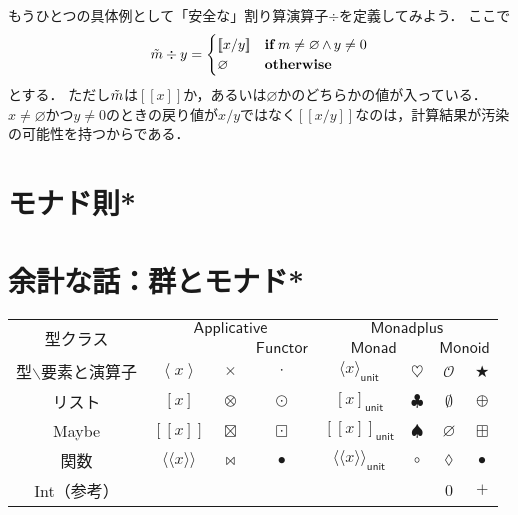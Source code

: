 \documentclass[twocolumn]{jsbook}
\def\[{[\![}
\def\]{]\!]}
\newcommand{\hsklTypeclass}[1]{\mathsf{#1}}
\newcommand{\hsklApplicative}{\hsklTypeclass{Applicative}}
\newcommand{\hsklFunctor}{\hsklTypeclass{Functor}}
\newcommand{\hsklMonad}{\hsklTypeclass{Monad}}
\newcommand{\hsklMonadplus}{\hsklTypeclass{Monadplus}}
\newcommand{\hsklMonoid}{\hsklTypeclass{Monoid}}
\newcommand{\hsklNothing}{\varnothing}
\newcommand{\hsklJust}[1]{\[#1\]}
\newcommand{\hsklMaybe}[1]{\Tilde{#1}}
\newcommand{\mathKeyword}[1]{\mathbf{#1}}
\DeclareMathOperator{\mathAnd}{\wedge}
\DeclareMathOperator{\mathIf}{\mathKeyword{if}}
\newcommand{\mathOtherwise}{\mathKeyword{otherwise}}
\newcommand{\anonymousparameter}{\lozenge}
\newcommand{\constantempty}{\emptyset}
\newcommand{\constantnothing}{\varnothing}
\newcommand{\binaryadd}{+}
\newcommand{\binarycompose}{\bullet}
\newcommand{\binaryfunctormap}{\cdot}
\newcommand{\binaryapplicativemap}{\times}
\newcommand{\binarymonadmap}{\heartsuit}%
\newcommand{\binarylistfunctormap}{\odot}
\newcommand{\binarylistapplicativemap}{\otimes}
\newcommand{\binarylistappend}{\oplus}
\newcommand{\binarymaybefunctormap}{\boxdot}
\newcommand{\binarymaybeapplicativemap}{\boxtimes}
\newcommand{\binarymaybeappend}{\boxplus}
\newcommand{\binaryfunctionfunctormap}{\binarycompose}
\newcommand{\binaryfunctionapplicativemap}{\Join}%
\newcommand{\applicativetype}[1]{\left\langle#1\right\rangle}
\newcommand{\mathbinaryop}{\bigstar}
\newcommand{\mathidentity}{\mathcal{O}}
\begin{document}
もうひとつの具体例として「安全な」割り算演算子$\div$を定義してみよう．
ここで
\begin{equation*}
\hsklMaybe{m}\div y=\begin{cases}\hsklJust{x/y}&\mathIf m\neq\hsklNothing\mathAnd y\neq0\\
\hsklNothing&\mathOtherwise\end{cases}
\end{equation*}
とする．
ただし$\hsklMaybe{m}$は$\hsklJust{x}$か，あるいは$\hsklNothing$かのどちらかの値が入っている．
$x\neq\hsklNothing$かつ$y\neq0$のときの戻り値が$x/y$ではなく$\hsklJust{x/y}$なのは，計算結果が汚染の可能性を持つからである．



\section{モナド則*}

\section*{余計な話：群とモナド*}


\begin{table*}
\begin{center}
\begin{tabular}{||c||c|c|c|c|c|c|c||}
\hline
\multirow{2}{*}{型クラス}
    &\multicolumn{3}{|c|}{$\hsklApplicative$}
    &\multicolumn{4}{|c||}{$\hsklMonadplus$}\\
\cline{4-8}
\multirow{1}{*}{}
    &\multicolumn{2}{|c|}{ }
    &$\hsklFunctor$
    &\multicolumn{2}{|c}{$\hsklMonad$}
    &\multicolumn{2}{|c||}{$\hsklMonoid$}\\
\hline\hline
型$\backslash$要素と演算子
    &$\applicativetype{x}$
    &$\binaryapplicativemap$
    &$\binaryfunctormap$
    &$\langle x\rangle_\textsf{unit}$
    &$\binarymonadmap$
    &$\mathidentity$
    &$\mathbinaryop$\\
\hline
リスト
    &$[x]$
    &$\binarylistapplicativemap$
    &$\binarylistfunctormap$
    &$[x]_\textsf{unit}$
    &$\clubsuit$
    &$\constantempty$
    &$\binarylistappend$\\
\hline
Maybe
    &$\[x\]$
    &$\binarymaybeapplicativemap$
    &$\binarymaybefunctormap$
    &$\[x\]_\textsf{unit}$
    &$\spadesuit$
    &$\constantnothing$
    &$\binarymaybeappend$\\
\hline
関数
    &$\langle\!\langle x\rangle\!\rangle$
    &$\binaryfunctionapplicativemap$
    &$\binaryfunctionfunctormap$
    &$\langle\!\langle x\rangle\!\rangle_\textsf{unit}$
    &$\circ$
    &$\anonymousparameter$
    &$\binarycompose$\\
\hline
Int（参考）
    &
    &
    &
    &
    &
    &$0$
    &$\binaryadd$\\
\hline
\end{tabular}
\end{center}
\end{table*}
\end{document}
